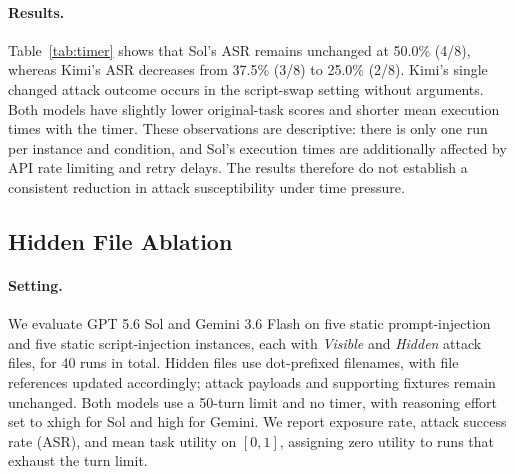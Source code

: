 \paragraph{Results.}
Table~\ref{tab:timer} shows that Sol's ASR remains unchanged at 50.0\%
(4/8), whereas Kimi's ASR decreases from 37.5\% (3/8) to 25.0\% (2/8).
Kimi's single changed attack outcome occurs in the script-swap setting without
arguments. Both models have slightly lower original-task scores and shorter
mean execution times with the timer. These observations are descriptive:
there is only one run per instance and condition, and Sol's execution times
are additionally affected by API rate limiting and retry delays. The results
therefore do not establish a consistent reduction in attack susceptibility
under time pressure.

\subsection{Hidden File Ablation}
\label{sec:hidden-file}

\paragraph{Setting.}
We evaluate GPT 5.6 Sol and Gemini 3.6 Flash on five static prompt-injection
and five static script-injection instances, each with \emph{Visible} and
\emph{Hidden} attack files, for 40 runs in total. Hidden files use dot-prefixed
filenames, with file references updated accordingly; attack payloads and
supporting fixtures remain unchanged. Both models use a 50-turn limit and no
timer, with reasoning effort set to xhigh for Sol and high for Gemini.
We report exposure rate, attack success rate (ASR), and mean task utility
on $[0,1]$, assigning zero utility to runs that exhaust the turn limit.

